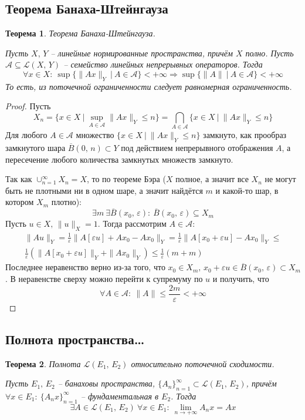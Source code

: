 \documentclass[a4paper,12pt]{article}
\renewcommand{\leq}{\ensuremath{\leqslant}}
\theoremstyle{plain}
\newtheorem{theorem}{Теорема}[section]
\theoremstyle{definition}
\theoremstyle{remark}
\begin{document}
\subsection{Теорема Банаха-Штейнгауза}
\begin{theorem}
  Теорема Банаха-Штейнгауза.

  Пусть $X,\,Y$ -- линейные нормированные пространства, причём $X$ полно. Пусть $\mathcal{A} \subseteq \mathcal{L}(X,\, Y)$ -- семейство линейных непрерывных операторов. Тогда
  \[
    \forall x \in X :\: \sup \{\|Ax\|_Y \:\vert\: A \in \mathcal{A}\} < +\infty \Rightarrow \sup\{\|A\| \:\vert\: A \in \mathcal{A}\} < +\infty
  \]
  То есть, из поточечной ограниченности следует равномерная ограниченность.
\end{theorem}

\begin{proof}
  Пусть
  \[
    X_n = \{x \in X \:\vert\: \sup_{A \in \mathcal{A}} \|Ax\|_Y \leq n\} = \bigcap_{A \in \mathcal{A}} \{x \in X \:\vert\: \|Ax\|_Y \leq n\}
  \]
  Для любого $A \in \mathcal{A}$ множество $\{x \in X \:\vert\: \|Ax\|_Y \leq n\}$ замкнуто, как прообраз замкнутого шара $\overline{B}(0,\,n) \subset Y$ под действием непрерывного отображения $A$, а пересечение любого количества замкнутых множеств замкнуто.

  Так как $\cup_{n = 1}^\infty X_n = X$, то по теореме Бэра ($X$ полное, а значит все $X_n$ не могут быть не плотными ни в одном шаре, а значит найдётся $m$ и какой-то шар, в котором $X_m$ плотно):
  \[
    \exists m \: \exists \overline{B}(x_0,\,\varepsilon) :\: \overline{B}(x_0,\, \varepsilon) \subseteq X_m
  \]
  Пусть $u \in X,\, \|u\|_X = 1$. Тогда рассмотрим $A \in \mathcal{A}$:
  \begin{align*}
    \|Au\|_Y = \frac{1}{\varepsilon}\|A[\varepsilon u] + Ax_0 - Ax_0\|_Y = \frac{1}{\varepsilon}\|A[x_0 + \varepsilon u] - Ax_0\|_Y \leq\\
    \frac{1}{\varepsilon}\left(\|A[x_0 + \varepsilon u]\|_Y + \|Ax_0\|_Y\right) \leq \frac{1}{\varepsilon}(m + m)
  \end{align*}
  Последнее неравенство верно из-за того, что $x_0 \in X_m,\, x_0 + \varepsilon u \in \overline{B}(x_0,\,\varepsilon) \subset X_m$. В неравенстве сверху можно перейти к супремуму по $u$ и получить, что
  \[
    \forall A \in \mathcal{A} :\: \|A\| \leq \frac{2m}{\varepsilon} < +\infty
  \]
\end{proof}

\subsection{Полнота пространства\dots}
\begin{theorem}
  Полнота $\mathcal{L}(E_1,\, E_2)$ относительно поточечной сходимости.

  Пусть $E_1,\, E_2$ -- банаховы пространства, $\{A_n\}_{n=1}^\infty \subset \mathcal{L}(E_1,\, E_2)$, причём $\forall x \in E_1 :\: \{A_nx\}_{n=1}^\infty$ -- фундаментальная в $E_2$. Тогда
  \[
    \exists A \in \mathcal{L}(E_1,\, E_2) \: \forall x \in E_1 :\: \lim_{n \to +\infty} A_nx = Ax 
  \]
\end{theorem}
\end{document}
